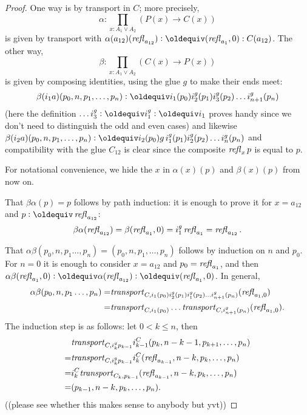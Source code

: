 \begin{proof}
One way is by transport in $C$; more precisely, 
$$\alpha:\prod_{x:A_1\vee A_2}(P(x)\to C(x))$$ is given by transport with $\alpha(a_{12})(\refl{a_{12}})\defequi(\refl{a_{1}},0):C(a_{12})$.  %
The other way, 
$$\beta:\prod_{x:A_1\vee A_2}(C(x)\to P(x))$$ is given by composing identities, using the glue $g$ to make their ends meet: 
$$\beta(i_1a)(p_0,n,p_1,\dots,p_n)\defequi i_1(p_0)i_2^g(p_1)i_3^g(p_2) \dots i_{n+1}^g(p_n)$$ 
(here the definition $\dots i_3^g\defequi i_1^g\defequi i_1$ proves handy since we don't need to distinguish the odd and even cases)  %
and likewise $\beta(i_2a)(p_0,n,p_1,\dots,p_n)\defequi i_2(p_0)g\,i_1^g(p_1)i_2^g(p_2) \dots i_{n}^g(p_n)$ and compatibility with the glue $C_{12}$ is clear since the composite $\mathop{{\it refl}_{x}}p$ is equal to $p$.

For notational convenience, we hide the $x$ in $\alpha(x)(p)$ and $\beta(x)(p)$ from now on.

That $\beta\alpha(p)=p$ follows by path induction: it is enough to prove it for $x=a_{12}$ and
$p\defequi\refl{a_{12}}$:
$$\beta\alpha(\mathop{{\it refl}_{a_{12}}})=\beta(\mathop{{\it refl}_{a_1}},0)=i_1^g\mathop{{\it refl}_{a_1}}=\mathop{{\it refl}_{a_{12}}}.$$  

That $\alpha\beta(p_0,n,p_1\dots,p_n)=(p_0,n,p_1,\dots,p_n)$ follows by induction on $n$ and $p_0$.  For $n=0$ it is enough to consider  $x=a_{12}$ and $p_0=\mathop{{\it refl}_{a_1}}$, and then 
$\alpha\beta(\refl{a_1},0)\defequi\alpha(\refl{a_{12}})\defequi(\refl{a_1},0)$.  In general, 
\begin{align*}
  \alpha\beta(p_0,n,p_1\dots,p_n)
=&\mathord{\mathit{transport}}_{C,i_1(p_0)i_2^g(p_1)i_1^g(p_2) \dots i_{n+1}^g(p_n)}(\mathop{{\it refl}_{a_1,0}})\\
=&\mathord{\mathit{transport}}_{C,i_1(p_0)}\dots\mathord{\mathit{transport}}_{C,i_{n+1}^g(p_n)}(\mathop{{\it refl}_{a_1,0}}).
\end{align*}
  The induction step is as follows: let $0< k\leq n$, then 
\begin{align*}
  &\mathord{\mathit{transport}}_{C,i_k^gp_{k-1}}i^C_{k-1}(p_k,n-k-1,p_{k+1},\dots,p_n)\\
  =&\mathord{\mathit{transport}}_{C,i_k^gp_{k-1}}i^C_k(\mathop{{\it refl}_{a_{k-1}}},n-k,p_k,\dots,p_n)\\
  =&i^C_k\mathord{\mathit{transport}}_{C_k,p_{k-1}}(\mathop{{\it refl}_{a_{k-1}}},n-k,p_k,\dots,p_n)\\
  =&(p_{k-1},n-k,p_k,\dots,p_n).
\end{align*}
((please see whether this makes sense to anybody but yvt))
\end{proof}

